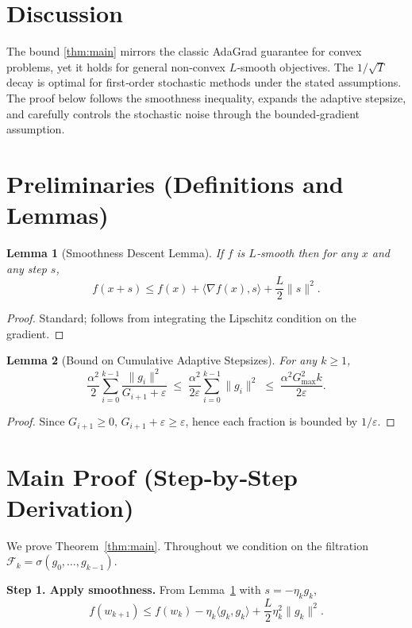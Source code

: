 \documentclass[11pt]{article}
\newtheorem{lemma}{Lemma}
\begin{document}
\section*{Discussion}
The bound \eqref{thm:main} mirrors the classic AdaGrad guarantee for convex
problems, yet it holds for general non‑convex $L$‑smooth objectives.
The $1/\sqrt{T}$ decay is optimal for first‑order stochastic methods under
the stated assumptions.  The proof below follows the smoothness inequality,
expands the adaptive stepsize, and carefully controls the stochastic noise
through the bounded‑gradient assumption.

\section*{Preliminaries (Definitions and Lemmas)}
\begin{lemma}[Smoothness Descent Lemma]\label{lem:smooth}
If $f$ is $L$‑smooth then for any $x$ and any step $s$,
\[
f(x+s)\le f(x)+\langle\nabla f(x),s\rangle+\frac{L}{2}\|s\|^{2}.
\]
\end{lemma}
\begin{proof}
Standard; follows from integrating the Lipschitz condition on the gradient.
\end{proof}

\begin{lemma}[Bound on Cumulative Adaptive Stepsizes]\label{lem:stepbound}
For any $k\ge1$,
\[
\frac{\alpha^{2}}{2}\sum_{i=0}^{k-1}\frac{\|g_{i}\|^{2}}{G_{i+1}+\varepsilon}
\;\le\;
\frac{\alpha^{2}}{2\varepsilon}\sum_{i=0}^{k-1}\|g_{i}\|^{2}
\;\le\;
\frac{\alpha^{2}G_{\max}^{2}k}{2\varepsilon}.
\]
\end{lemma}
\begin{proof}
Since $G_{i+1}\ge 0$, $G_{i+1}+\varepsilon\ge\varepsilon$,
hence each fraction is bounded by $1/\varepsilon$.
\end{proof}

\section*{Main Proof (Step‑by‑Step Derivation)}
We prove Theorem~\ref{thm:main}.  Throughout we condition on the filtration
$\mathcal{F}_{k}=\sigma(g_{0},\dots,g_{k-1})$.

\medskip
\noindent\textbf{Step 1. Apply smoothness.}  
From Lemma~\ref{lem:smooth} with $s=-\eta_{k}g_{k}$,
\[
f(w_{k+1})\le f(w_{k})-\eta_{k}\langle g_{k},g_{k}\rangle
+\frac{L}{2}\eta_{k}^{2}\|g_{k}\|^{2}.
\tag{3}
\]
\end{document}
